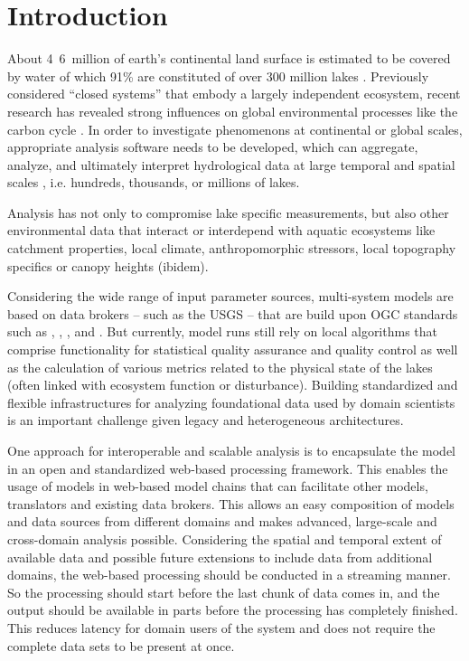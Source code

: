 
\chapter{Introduction}

About \unit{4.6 million}{\kilo\square\metre} of earth's continental land surface is estimated to be covered by water of which 91\% are constituted of over 300 million lakes \citep{downing2006global}. Previously considered ``closed systems'' that embody a largely independent ecosystem, recent research has revealed strong influences on global environmental processes like the carbon cycle \citep{cole2007plumbing}. In order to investigate phenomenons at continental or global scales, appropriate analysis software needs to be developed, which can aggregate, analyze, and ultimately interpret hydrological data at large temporal and spatial scales \citep{read2013upscaling}, i.e. hundreds, thousands, or millions of lakes.

Analysis has not only to compromise lake specific measurements, but also other environmental data that interact or interdepend with aquatic ecosystems like catchment properties, local climate, anthropomorphic stressors, local topography specifics or canopy heights (ibidem).

Considering the wide range of input parameter sources, multi-system models are based on data brokers -- such as the \ac{USGS}  -- that are build upon \ac{OGC} standards such as , , ,  and . But currently, model runs still rely on local algorithms that comprise functionality for statistical quality assurance and quality control as well as the calculation of various metrics related to the physical state of the lakes (often linked with ecosystem function or disturbance). Building standardized and flexible infrastructures for analyzing foundational data used by domain scientists is an important challenge given legacy and heterogeneous architectures.

One approach for interoperable and scalable analysis is to encapsulate the model in an open and standardized web-based processing framework. This enables the usage of models in web-based model chains that can facilitate other models, translators and existing data brokers. This allows an easy composition of models and data sources from different domains and makes advanced, large-scale and cross-domain analysis possible. Considering the spatial and temporal extent of available data and possible future extensions to include data from additional domains, the web-based processing should be conducted in a streaming manner. So the processing should start before the last chunk of data comes in, and the output should be available in parts before the processing has completely finished. This reduces latency for domain users of the system and does not require the complete data sets to be present at once.

